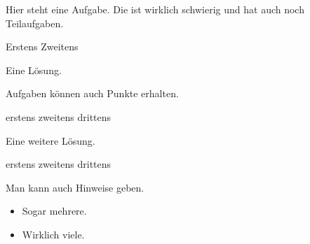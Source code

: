 \documentclass[a4paper]{scrartcl}
\begin{document}
    \begin{aufgabe}
        \setzeSymbol{\symZweiSprechblasen}
        Hier steht eine Aufgabe. Die ist wirklich schwierig und hat auch noch Teilaufgaben.
        \begin{teilaufgaben}
            \teilaufgabe Erstens
            \teilaufgabe Zweitens
        \end{teilaufgaben}
        \begin{loesung}
            Eine Lösung.
        \end{loesung}
        \begin{erwartungen}
        \end{erwartungen}
    \end{aufgabe}

    \begin{aufgabe}
        Aufgaben können auch Punkte erhalten.
        \begin{teilaufgaben}
            \teilaufgabe[5] erstens
            \teilaufgabe[10] zweitens
            \teilaufgabe[15] drittens
        \end{teilaufgaben}
        \begin{loesung}
            Eine weitere Lösung.
            \begin{teilaufgaben}
                \teilaufgabe erstens
                \teilaufgabe zweitens
                \teilaufgabe drittens
            \end{teilaufgaben}
        \end{loesung}
        \begin{erwartungen}
        \end{erwartungen}
        \begin{bearbeitungshinweis}
            Man kann auch Hinweise geben.
            \begin{itemize}
                \item Sogar mehrere.
                \item Wirklich viele.
            \end{itemize}
        \end{bearbeitungshinweis}
    \end{aufgabe}
\end{document}
